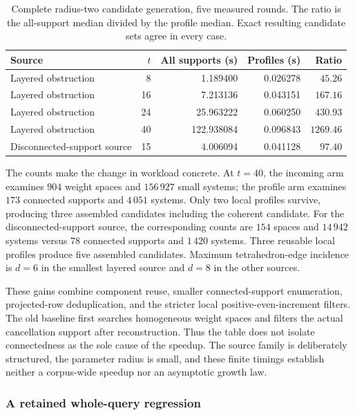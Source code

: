 \begin{table}[htbp]
\centering
\small
\begin{tabular}{lrrrr}
\hline
Source & $t$ & All supports (s) & Profiles (s) & Ratio\\
\hline
Layered obstruction & 8 & 1.189400 & 0.026278 & $45.26$\\
Layered obstruction & 16 & 7.213136 & 0.043151 & $167.16$\\
Layered obstruction & 24 & 25.963222 & 0.060250 & $430.93$\\
Layered obstruction & 40 & 122.938084 & 0.096843 & $1269.46$\\
Disconnected-support source & 15 & 4.006094 & 0.041128 & $97.40$\\
\hline
\end{tabular}
\caption{Complete radius-two candidate generation, five measured
rounds.  The ratio is the all-support median divided by the profile
median.  Exact resulting candidate sets agree in every case.}
\label{tab:profile-radius-two}
\end{table}

The counts make the change in workload concrete.  At $t=40$, the
incoming arm examines $904$ weight spaces and $156\,927$ small systems;
the profile arm examines $173$ connected supports and $4\,051$ systems.
Only two local profiles survive, producing three assembled candidates
including the coherent candidate.  For the disconnected-support source,
the corresponding counts are $154$ spaces and $14\,942$ systems versus
$78$ connected supports and $1\,420$ systems.  Three reusable local
profiles produce five assembled candidates.  Maximum tetrahedron-edge
incidence is $d=6$ in the smallest layered source and $d=8$ in the other
sources.

These gains combine component reuse, smaller connected-support
enumeration, projected-row deduplication, and the stricter local
positive-even-increment filters.  The old baseline first searches
homogeneous weight spaces and filters the actual cancellation support
after reconstruction.  Thus the table does not isolate connectedness
as the sole cause of the speedup.  The source family is deliberately
structured, the parameter radius is small, and these finite timings
establish neither a corpus-wide speedup nor an asymptotic growth law.

\subsubsection{A retained whole-query regression}

